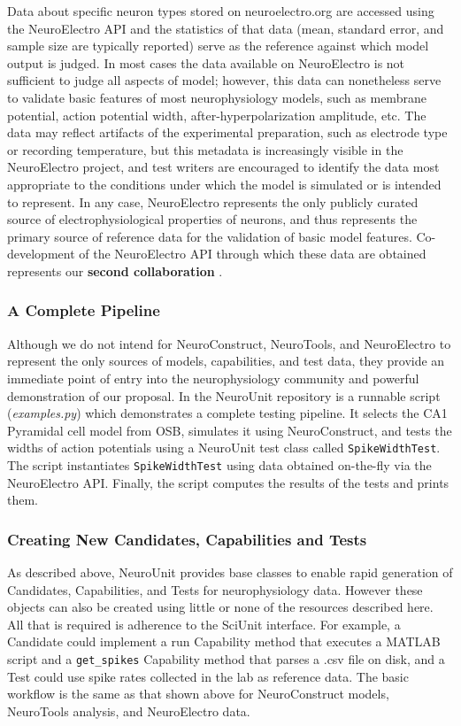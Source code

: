 \documentclass[11pt,letterpaper]{article}
\begin{document}
Data about specific neuron types stored on neuroelectro.org are accessed using the NeuroElectro API and the statistics of that data (mean, standard error, and sample size are typically reported) serve as the reference against which model output is judged.  In most cases the data available on NeuroElectro is not sufficient to judge all aspects of model; however, this data can nonetheless serve to validate basic features of most neurophysiology models, such as membrane potential, action potential width, after-hyperpolarization amplitude, etc.  The data may reflect artifacts of the experimental preparation, such as electrode type or recording temperature, but this metadata is increasingly visible in the NeuroElectro project, and test writers are encouraged to identify the data most appropriate to the conditions under which the model is simulated or is intended to represent.  In any case, NeuroElectro represents the only publicly curated source of electrophysiological properties of neurons, and thus represents the primary source of reference data for the validation of basic model features.  Co-development of the NeuroElectro API through which these data are obtained represents our \textbf{second collaboration} \cite{neuroelectro_dev_url}.  

\subsubsection{A Complete Pipeline}
Although we do not intend for NeuroConstruct, NeuroTools, and NeuroElectro to represent the only sources of models, capabilities, and test data, they provide an immediate point of entry into the neurophysiology community and powerful demonstration of our proposal.  In the NeuroUnit repository \cite{neurounit_url} is a runnable script (\textit{examples.py}) which demonstrates a complete testing pipeline.  It selects the CA1 Pyramidal cell model from OSB, simulates it using NeuroConstruct, and tests the widths of action potentials using a NeuroUnit test class called \verb|SpikeWidthTest|.  The script instantiates \verb|SpikeWidthTest| using data obtained on-the-fly via the NeuroElectro API.  Finally, the script computes the results of the tests and prints them.    

\subsubsection{Creating New Candidates, Capabilities and Tests}
As described above, NeuroUnit provides base classes to enable rapid generation of Candidates, Capabilities, and Tests for neurophysiology data.  However these objects can also be created using little or none of the resources described here.  All that is required is adherence to the SciUnit interface.  For example, a Candidate could implement a run Capability method that executes a MATLAB script and a \verb|get_spikes| Capability method that parses a .csv file on disk, and a Test could use spike rates collected in the lab as reference data. The basic workflow is the same as that shown above for NeuroConstruct models, NeuroTools analysis, and NeuroElectro data. 
\end{document}
